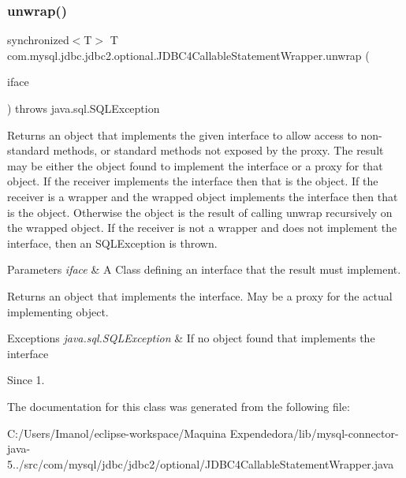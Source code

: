 \subsubsection{\texorpdfstring{unwrap()}{unwrap()}}
{\footnotesize\ttfamily synchronized$<$T$>$ T com.\+mysql.\+jdbc.\+jdbc2.\+optional.\+J\+D\+B\+C4\+Callable\+Statement\+Wrapper.\+unwrap (\begin{DoxyParamCaption}\item[{java.\+lang.\+Class$<$ T $>$}]{iface }\end{DoxyParamCaption}) throws java.\+sql.\+S\+Q\+L\+Exception}

Returns an object that implements the given interface to allow access to non-\/standard methods, or standard methods not exposed by the proxy. The result may be either the object found to implement the interface or a proxy for that object. If the receiver implements the interface then that is the object. If the receiver is a wrapper and the wrapped object implements the interface then that is the object. Otherwise the object is the result of calling {\ttfamily unwrap} recursively on the wrapped object. If the receiver is not a wrapper and does not implement the interface, then an {\ttfamily S\+Q\+L\+Exception} is thrown.


\begin{DoxyParams}{Parameters}
{\em iface} & A Class defining an interface that the result must implement. \\
\hline
\end{DoxyParams}
\begin{DoxyReturn}{Returns}
an object that implements the interface. May be a proxy for the actual implementing object. 
\end{DoxyReturn}

\begin{DoxyExceptions}{Exceptions}
{\em java.\+sql.\+S\+Q\+L\+Exception} & If no object found that implements the interface \\
\hline
\end{DoxyExceptions}
\begin{DoxySince}{Since}
1. 
\end{DoxySince}


The documentation for this class was generated from the following file\+:\begin{DoxyCompactItemize}
\item 
C\+:/\+Users/\+Imanol/eclipse-\/workspace/\+Maquina Expendedora/lib/mysql-\/connector-\/java-\/5../src/com/mysql/jdbc/jdbc2/optional/J\+D\+B\+C4\+Callable\+Statement\+Wrapper.\+java\end{DoxyCompactItemize}
